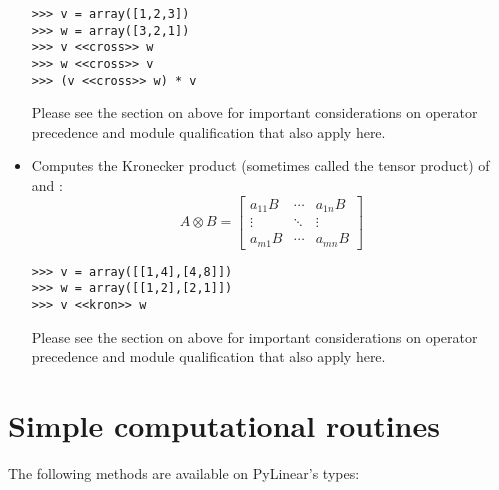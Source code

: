 \begin{itemize}
\begin{verbatim}
>>> v = array([1,2,3])
>>> w = array([3,2,1])
>>> v <<cross>> w
>>> w <<cross>> v
>>> (v <<cross>> w) * v
\end{verbatim}

  Please see the section on  above for important
  considerations on operator precedence and module qualification
  that also apply here.

\item {}
  
  Computes the Kronecker product 
  (sometimes called the tensor product) 
  of  and :
  \[%
    A \otimes B = 
    \begin{bmatrix} a_{11} B & \cdots & a_{1n}B \\ \vdots & 
    \ddots & \vdots \\ a_{m1} B & \cdots & a_{mn} B \end{bmatrix}
  \]

\begin{verbatim}
>>> v = array([[1,4],[4,8]])
>>> w = array([[1,2],[2,1]])
>>> v <<kron>> w
\end{verbatim}

  Please see the section on  above for important
  considerations on operator precedence and module qualification
  that also apply here.

\end{itemize}

\section{Simple computational routines}

The following methods are available on PyLinear's  types:

